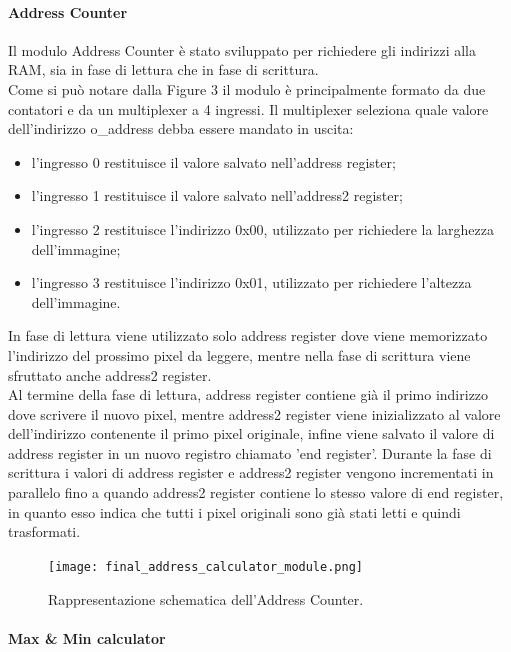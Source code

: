 \paragraph{Address Counter\\}

Il modulo Address Counter è stato sviluppato per richiedere gli indirizzi alla RAM, sia in fase di lettura che in fase di scrittura.\\
Come si può notare dalla Figure 3 il modulo è principalmente formato da due contatori e da un multiplexer a 4 ingressi. Il multiplexer seleziona quale valore dell'indirizzo o\_address debba essere mandato in uscita:
\begin{itemize}
    \item l'ingresso 0 restituisce il valore salvato nell'address register;
    \item l'ingresso 1 restituisce il valore salvato nell'address2 register;
    \item l'ingresso 2 restituisce l'indirizzo 0x00, utilizzato per richiedere la larghezza dell'immagine;
    \item l'ingresso 3 restituisce l'indirizzo 0x01, utilizzato per richiedere l'altezza dell'immagine.
\end{itemize}
In fase di lettura viene utilizzato solo address register dove viene memorizzato l'indirizzo del prossimo pixel da leggere, mentre nella fase di scrittura viene sfruttato anche address2 register.\\
Al termine della fase di lettura, address register contiene già il primo indirizzo dove scrivere il nuovo pixel, mentre address2 register viene inizializzato al valore dell'indirizzo contenente il primo pixel originale, infine viene salvato il valore di address register in un nuovo registro chiamato 'end register'.
Durante la fase di scrittura i valori di address register e address2 register vengono incrementati in parallelo fino a quando address2 register contiene lo stesso valore di end register, in quanto esso indica che tutti i pixel originali sono già stati letti e quindi trasformati.

\begin{figure}[h!]
\centering
\texttt{[image: final\_address\_calculator\_module.png]}%
\caption{Rappresentazione schematica dell'Address Counter.}
\end{figure}


\paragraph{Max \& Min calculator\\}

